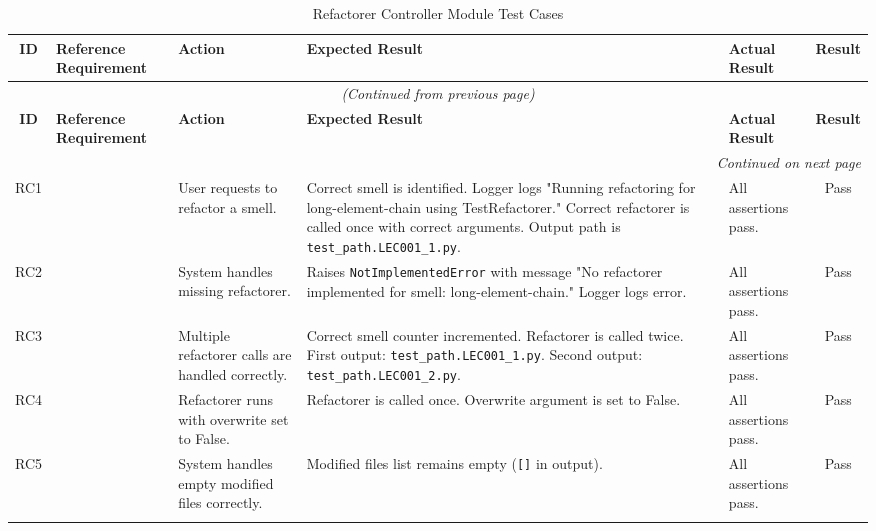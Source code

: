 \documentclass[12pt, titlepage]{article}
\begin{document}
\renewcommand{\arraystretch}{1.2} %

\begin{longtable}{|c|p{2.5cm}|p{2cm}|p{4cm}|p{4cm}|c|}
\hline
\textbf{ID} & \textbf{Reference Requirement} & \textbf{Action} & \textbf{Expected Result} & \textbf{Actual Result} & \textbf{Result} \\ \hline
\endfirsthead

\multicolumn{6}{c}{\textit{(Continued from previous page)}} \\ \hline
\textbf{ID} & \textbf{Reference Requirement} & \textbf{Action} & \textbf{Expected Result} & \textbf{Actual Result} & \textbf{Result} \\ \hline
\endhead

\hline \multicolumn{6}{|r|}{\textit{Continued on next page}} \\ \hline
\endfoot

\hline
\endlastfoot

RC1 & & User requests to refactor a smell. & Correct smell is identified. Logger logs "Running refactoring for long-element-chain using TestRefactorer." Correct refactorer is called once with correct arguments. Output path is \texttt{test\_path.LEC001\_1.py}. & All assertions pass. & \cellcolor{green!20} Pass \\ \hline
RC2 & & System handles missing refactorer. & Raises \texttt{NotImplementedError} with message "No refactorer implemented for smell: long-element-chain." Logger logs error. & All assertions pass. & \cellcolor{green!20} Pass \\ \hline
RC3 & & Multiple refactorer calls are handled correctly. & Correct smell counter incremented. Refactorer is called twice. First output: \texttt{test\_path.LEC001\_1.py}. Second output: \texttt{test\_path.LEC001\_2.py}. & All assertions pass. & \cellcolor{green!20} Pass \\ \hline
RC4 & & Refactorer runs with overwrite set to False. & Refactorer is called once. Overwrite argument is set to False. & All assertions pass. & \cellcolor{green!20} Pass \\ \hline
RC5 & & System handles empty modified files correctly. & Modified files list remains empty (\texttt{[]} in output). & All assertions pass. & \cellcolor{green!20} Pass \\ \hline

\caption{Refactorer Controller Module Test Cases}
\label{table:refactorer_controller_tests}
\end{longtable}
\end{document}
